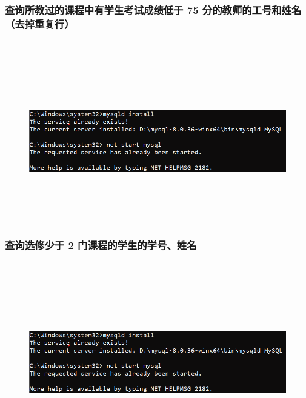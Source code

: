 \documentclass{ctexart}
\begin{document}
\subsubsection{查询所教过的课程中有学生考试成绩低于 75 分的教师的工号和姓名（去掉重复行）}
\begin{lstlisting}[language=sql]
	
\end{lstlisting}
\begin{figure}[H]
	\centering 
	\includegraphics[height=7cm,width=14cm]{1.png}
	\end{figure}
\subsubsection{查询选修少于 2 门课程的学生的学号、姓名}
\begin{lstlisting}[language=sql]
	
\end{lstlisting}
\begin{figure}[H]
	\centering 
	\includegraphics[height=7cm,width=14cm]{1.png}
	\end{figure}
\end{document}
